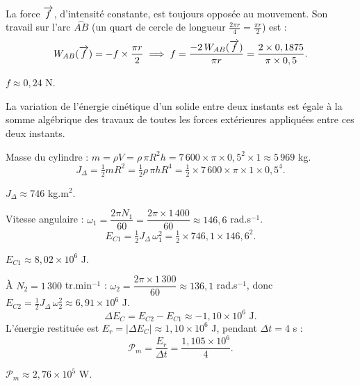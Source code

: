 La force $\overrightarrow{f}$, d'intensité constante, est toujours opposée au mouvement. Son travail sur l'arc
$\overset{\frown}{AB}$ (un quart de cercle de longueur $\frac{2\pi r}{4} = \frac{\pi r}{2}$) est :
\[
W_{AB}(\overrightarrow{f}) = - f \times \frac{\pi r}{2}
\;\Longrightarrow\;
f = \frac{-2\,W_{AB}(\overrightarrow{f})}{\pi r} = \frac{2 \times 0,1875}{\pi \times 0,5}.
\]
\begin{resultat}
$f \approx 0,24$ N.
\end{resultat}

\begin{resultat}
La variation de l'énergie cinétique d'un solide entre deux instants est égale à la somme algébrique
des travaux de toutes les forces extérieures appliquées entre ces deux instants.
\end{resultat}


Masse du cylindre : $m = \rho V = \rho\,\pi R^2 h = 7\,600 \times \pi \times 0,5^2 \times 1
\approx 5\,969$ kg.
\[
J_\Delta = \tfrac{1}{2} m R^2 = \tfrac{1}{2} \rho\,\pi h R^4
= \tfrac{1}{2} \times 7\,600 \times \pi \times 1 \times 0,5^4.
\]
\begin{resultat}
$J_\Delta \approx 746$ kg.m$^2$.
\end{resultat}

Vitesse angulaire : $\omega_1 = \dfrac{2\pi N_1}{60} = \dfrac{2\pi \times 1\,400}{60}
\approx 146,6$ rad.s$^{-1}$.
\[
E_{C1} = \tfrac{1}{2} J_\Delta\, \omega_1^2 = \tfrac{1}{2} \times 746,1 \times 146,6^2.
\]
\begin{resultat}
$E_{C1} \approx 8,02 \times 10^6$ J.
\end{resultat}

À $N_2 = 1\,300$ tr.min$^{-1}$ : $\omega_2 = \dfrac{2\pi \times 1\,300}{60} \approx 136,1$ rad.s$^{-1}$,
donc $E_{C2} = \tfrac{1}{2} J_\Delta\, \omega_2^2 \approx 6,91 \times 10^6$ J.
\[
\Delta E_C = E_{C2} - E_{C1} \approx -1,10 \times 10^6 \text{ J.}
\]
L'énergie restituée est $E_r = |\Delta E_C| \approx 1,10 \times 10^6$ J, pendant $\Delta t = 4$ s :
\[
\mathcal{P}_m = \frac{E_r}{\Delta t} = \frac{1,105 \times 10^6}{4}.
\]
\begin{resultat}
$\mathcal{P}_m \approx 2,76 \times 10^5$ W.
\end{resultat}

